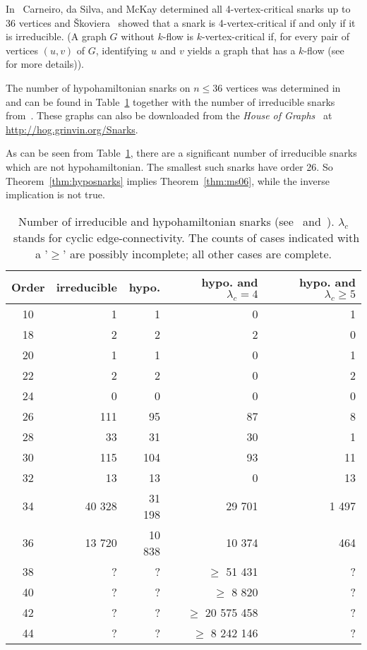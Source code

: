 \documentclass{amcjoucc}
\begin{document}
In~\cite{carneiro2015faster} Carneiro, da Silva, and McKay determined all 4-vertex-critical snarks up to 36 vertices and \v{S}koviera~\cite{skoviera-pers} showed that a snark is 4-vertex-critical if and only if it is irreducible. 
(A graph $G$ without $k$-flow is $k$-vertex-critical if, for every pair of vertices $(u,v)$ of $G$, identifying $u$ and $v$ yields a graph that has a $k$-flow (see~\cite{carneiro2015faster} for more details)).

The number of hypohamiltonian snarks on $n \le 36$ vertices was determined in~\cite{BGHM13} and can be found in Table~\ref{table:numhypo} together with the number of irreducible snarks from~\cite{carneiro2015faster}. These graphs can also be downloaded from the \textit{House of Graphs}~\cite{hog} at \\ \url{http://hog.grinvin.org/Snarks}.

As can be seen from Table~\ref{table:numhypo}, there are a significant number of irreducible snarks which are not hypohamiltonian. The smallest such snarks have order 26. So Theorem~\ref{thm:hyposnarks} implies Theorem~\ref{thm:ms06}, while the inverse implication is not true.


\begin{table}[ht!]
\centering
		\begin{tabular}{| c | r | r | r | r |}
		\hline
		Order & irreducible & hypo. & hypo. and $\lambda_c = 4$ & hypo. and $\lambda_c \geq 5$\\
		\hline
10  &   1  &   1  & 0 &  1\\
18  &   2  &   2  & 2 &  0\\
20  &   1  &   1  & 0 &  1\\
22  &   2  &   2  & 0 &  2\\
24  &   0  &   0  & 0 &  0\\
26  &   111  &   95  & 87 &  8\\
28  &   33  &   31  &  30 &   1\\
30  &   115  &   104  & 93 &  11\\
32  &   13  &   13  & 0 &   13\\
34  &   40 328  &   31 198  & 29 701 &  1 497\\
36  &   13 720  &   10 838  &  10 374 & 464\\
38  &   ?  &   ?  &  $\ge $ 51 431 & ?\\
40  &   ?  &   ?  &  $\ge $ 8 820 & ?\\
42  &   ?  &   ?  &  $\ge $ 20 575 458 & ?\\
44  &   ?  &   ?  &  $\ge $ 8 242 146 & ?\\
		\hline
		\end{tabular}
		\caption{Number of irreducible and hypohamiltonian snarks (see~\cite[Table 1]{carneiro2015faster} and~\cite[Table 2]{BGHM13}). $\lambda_c$~stands for cyclic edge-connectivity. The counts of cases indicated with a '$\ge$' are possibly incomplete; all other cases are complete.}
		\label{table:numhypo}
\end{table}
\end{document}
